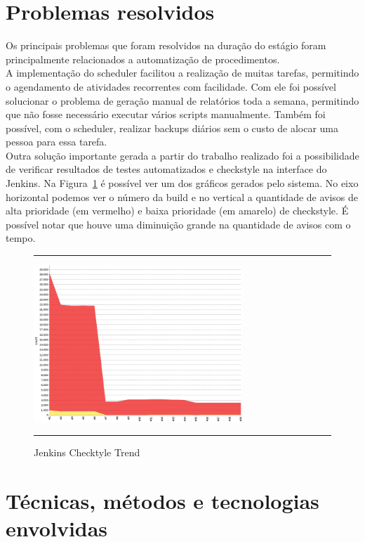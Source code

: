 \section{Problemas resolvidos}

Os principais problemas que foram resolvidos na duração do estágio foram principalmente relacionados a automatização de procedimentos.\\

A implementação do \gls{scheduler} facilitou a realização de muitas tarefas, permitindo o agendamento de atividades recorrentes com facilidade. Com ele foi possível solucionar o problema de geração manual de relatórios toda a semana, permitindo que não fosse necessário executar vários scripts manualmente. Também foi possível, com o \gls{scheduler}, realizar \glspl{backup} diários sem o custo de alocar uma pessoa para essa tarefa.\\

Outra solução importante gerada a partir do trabalho realizado foi a possibilidade de verificar resultados de testes automatizados e \gls{checkstyle} na interface do \gls{Jenkins}. Na Figura~\ref{fig:jenkinsCheckstyle} é possível ver um dos gráficos gerados pelo sistema. No eixo horizontal podemos ver o número da build e no vertical a quantidade de avisos de alta prioridade (em vermelho) e baixa prioridade (em amarelo) de \gls{checkstyle}. É possível notar que houve uma diminuição grande na quantidade de avisos com o tempo.

\begin{figure}[h]
  \rule[1ex]{\textwidth}{0.25pt}
  \centering\includegraphics[width=0.70\textwidth]{img/Jenkins.png}
  \caption[Jenkins Checkstyle Trend]
  {Jenkins Checktyle Trend}\label{fig:jenkinsCheckstyle}
  \rule[1ex]{\textwidth}{0.25pt}
\end{figure}

\section{Técnicas, métodos e tecnologias envolvidas}

